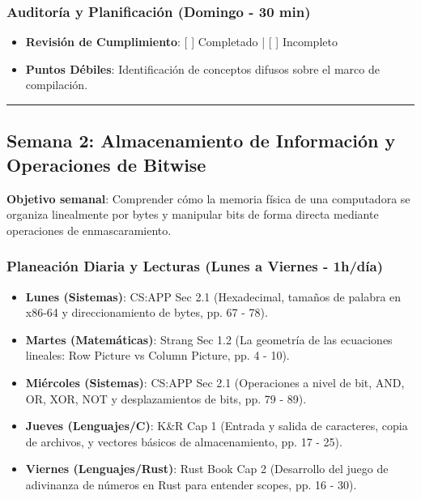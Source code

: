 \documentclass[11pt, a4paper]{article}
\begin{document}
\subsubsection{Auditoría y Planificación (Domingo - 30 min)}
\begin{itemize}
    \item \textbf{Revisión de Cumplimiento}: [ ] Completado | [ ] Incompleto
    \item \textbf{Puntos Débiles}: Identificación de conceptos difusos sobre el marco de compilación.
\end{itemize}

\noindent\rule{\textwidth}{0.4pt}

\subsection{Semana 2: Almacenamiento de Información y Operaciones de Bitwise}
\textbf{Objetivo semanal}: Comprender cómo la memoria física de una computadora se organiza linealmente por bytes y manipular bits de forma directa mediante operaciones de enmascaramiento.

\subsubsection{Planeación Diaria y Lecturas (Lunes a Viernes - 1h/día)}
\begin{itemize}
    \item \textbf{Lunes (Sistemas)}: CS:APP Sec 2.1 (Hexadecimal, tamaños de palabra en x86-64 y direccionamiento de bytes, pp. 67 - 78).
    \item \textbf{Martes (Matemáticas)}: Strang Sec 1.2 (La geometría de las ecuaciones lineales: Row Picture vs Column Picture, pp. 4 - 10).
    \item \textbf{Miércoles (Sistemas)}: CS:APP Sec 2.1 (Operaciones a nivel de bit, AND, OR, XOR, NOT y desplazamientos de bits, pp. 79 - 89).
    \item \textbf{Jueves (Lenguajes/C)}: K\&R Cap 1 (Entrada y salida de caracteres, copia de archivos, y vectores básicos de almacenamiento, pp. 17 - 25).
    \item \textbf{Viernes (Lenguajes/Rust)}: Rust Book Cap 2 (Desarrollo del juego de adivinanza de números en Rust para entender scopes, pp. 16 - 30).
\end{itemize}
\end{document}
